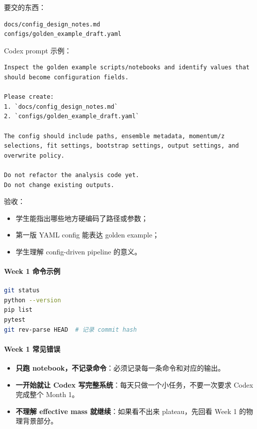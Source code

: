 \documentclass[11pt,a4paper,fontset=fandol]{ctexart}
\begin{document}
要交的东西：

\begin{lstlisting}
docs/config_design_notes.md
configs/golden_example_draft.yaml
\end{lstlisting}

Codex prompt 示例：

\begin{lstlisting}
Inspect the golden example scripts/notebooks and identify values that should become configuration fields.

Please create:
1. `docs/config_design_notes.md`
2. `configs/golden_example_draft.yaml`

The config should include paths, ensemble metadata, momentum/z selections, fit settings, bootstrap settings, output settings, and overwrite policy.

Do not refactor the analysis code yet.
Do not change existing outputs.
\end{lstlisting}

验收：

\begin{itemize}[leftmargin=2em]
  \item 学生能指出哪些地方硬编码了路径或参数；
  \item 第一版 YAML config 能表达 golden example；
  \item 学生理解 config-driven pipeline 的意义。
\end{itemize}

\paragraph{Week 1 命令示例}

\begin{lstlisting}[language=bash]
git status
python --version
pip list
pytest
git rev-parse HEAD  # 记录 commit hash
\end{lstlisting}

\paragraph{Week 1 常见错误}
\begin{itemize}[leftmargin=2em]
  \item \textbf{只跑 notebook，不记录命令}：必须记录每一条命令和对应的输出。
  \item \textbf{一开始就让 Codex 写完整系统}：每天只做一个小任务，不要一次要求 Codex 完成整个 Month 1。
  \item \textbf{不理解 effective mass 就继续}：如果看不出来 plateau，先回看 Week 1 的物理背景部分。
\end{itemize}
\end{document}
